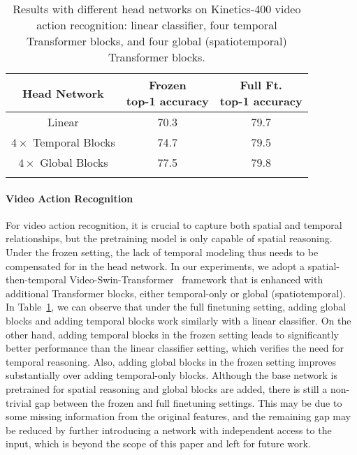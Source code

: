 \documentclass{article}
\begin{document}
\begin{table}[h]
        \centering
\addtolength{\tabcolsep}{3.0pt}
        \begin{tabular}{c|cc}
            \Xhline{1.0pt}
            Head Network& \makecell{Frozen\\top-1 accuracy} & \makecell{Full Ft.\\top-1 accuracy}\\
            \hline
            Linear & 70.3 & 79.7 \\
            $4\times$ Temporal Blocks & 74.7 & 79.5 \\
            $4\times$ Global Blocks & 77.5 & 79.8 \\
          \Xhline{1.0pt}  
       \end{tabular}
       \caption{Results with different head networks on Kinetics-400 video action recognition: linear classifier, four temporal Transformer blocks, and four global (spatiotemporal) Transformer blocks.}
    \label{tab:param_at_head_k400}
\end{table}

\paragraph{Video Action Recognition}
For video action recognition, it is crucial to capture both spatial and temporal relationships, but the pretraining model is only capable of spatial reasoning. Under the frozen setting, the lack of temporal modeling thus needs to be compensated for in the head network. In our experiments, we adopt a spatial-then-temporal Video-Swin-Transformer~\cite{liu2021video} framework that is enhanced with additional Transformer blocks, either temporal-only or global (spatiotemporal). In Table~\ref{tab:param_at_head_k400}, we can observe that under the full finetuning setting, adding global blocks and adding temporal blocks work similarly with a linear classifier. On the other hand, adding temporal blocks in the frozen setting leads to significantly better performance than the linear classifier setting, which verifies the need for temporal reasoning. Also, adding global blocks in the frozen setting improves substantially over adding temporal-only blocks. Although the base network is pretrained for spatial reasoning and global blocks are added, there is still a non-trivial gap between the frozen and full finetuning settings. This may be due to some missing information from the original features, and the remaining gap may be reduced by further introducing a network with independent access to the input, which is beyond the scope of this paper and left for future work.
\end{document}
